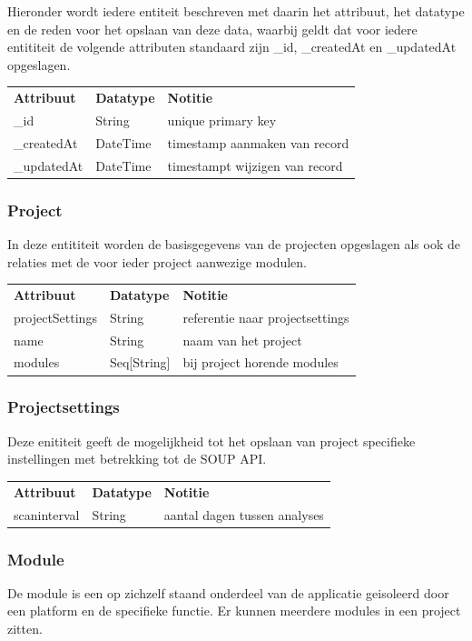 Hieronder wordt iedere entiteit beschreven met daarin het attribuut, het datatype en de reden voor het opslaan van deze data, waarbij geldt dat voor iedere entititeit de volgende attributen standaard zijn \_id, \_createdAt en \_updatedAt opgeslagen.

\begin{tabular}{lll}
    \textbf{Attribuut} & \textbf{Datatype} & \textbf{Notitie}\\
    \_id & String & unique primary key\\
    \_createdAt & DateTime & timestamp aanmaken van record\\
    \_updatedAt & DateTime & timestampt wijzigen van record\\

\end{tabular}
\subsubsection{Project}\label{subsubsec:project}
In deze entititeit worden de basisgegevens van de projecten opgeslagen als ook de relaties met de voor ieder project aanwezige modulen.

\begin{tabular}{lll}
    \textbf{Attribuut} & \textbf{Datatype} & \textbf{Notitie}\\
    projectSettings & String & referentie naar projectsettings\\
    name & String & naam van het project\\
    modules & Seq[String] & bij project horende modules\\

\end{tabular}
\subsubsection{Projectsettings}\label{subsubsec:projectsettings}
Deze enititeit geeft de mogelijkheid tot het opslaan van project specifieke instellingen met betrekking tot de SOUP API\@.

\begin{tabular}{lll}
    \textbf{Attribuut} & \textbf{Datatype} & \textbf{Notitie}\\
    scaninterval  & String & aantal dagen tussen analyses\\
\end{tabular}

\subsubsection{Module}\label{subsubsec:module}
De module is een op zichzelf staand onderdeel van de applicatie geisoleerd door een platform en de specifieke functie. Er kunnen meerdere modules in een project zitten.

